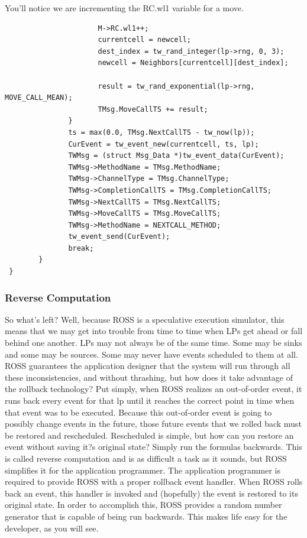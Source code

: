 \documentclass[12pt]{article}
\begin{document}
You'll notice we are incrementing the RC.wl1 variable for a move.

 
\begin{verbatim}
                      M->RC.wl1++;
                      currentcell = newcell;
                      dest_index = tw_rand_integer(lp->rng, 0, 3);
                      newcell = Neighbors[currentcell][dest_index];

                      result = tw_rand_exponential(lp->rng, MOVE_CALL_MEAN);
                      TMsg.MoveCallTS += result;
               }
               ts = max(0.0, TMsg.NextCallTS - tw_now(lp));
               CurEvent = tw_event_new(currentcell, ts, lp);
               TWMsg = (struct Msg_Data *)tw_event_data(CurEvent);
               TWMsg->MethodName = TMsg.MethodName;
               TWMsg->ChannelType = TMsg.ChannelType;
               TWMsg->CompletionCallTS = TMsg.CompletionCallTS;
               TWMsg->NextCallTS = TMsg.NextCallTS;
               TWMsg->MoveCallTS = TMsg.MoveCallTS;
               TWMsg->MethodName = NEXTCALL_METHOD;
               tw_event_send(CurEvent);
               break;
        }
 }
\end{verbatim}
 
\subsubsection{Reverse Computation}
So what's left?  Well, because ROSS is a speculative execution
simulator, this means that we may get into trouble from time to time
when LPs get ahead or fall behind one another.  LPs may not always be
of the same time.  Some may be sinks and some may be sources.  Some
may never have events scheduled to them at all.  ROSS guarantees the
application designer that the system will run through all these
inconsistencies, and without thrashing, but how does it take advantage
of the rollback technology?  Put simply, when ROSS realizes an
out-of-order event, it runs back every event for that lp until it
reaches the correct point in time when that event was to be executed.
Because this out-of-order event is going to possibly change events in
the future, those future events that we rolled back must be restored
and rescheduled.  Rescheduled is simple, but how can you restore an
event without saving it?s original state?  Simply run the formulas
backwards.  This is called reverse computation and is as difficult a
task as it sounds, but ROSS simplifies it for the application
programmer.  The application programmer is required to provide ROSS
with a proper rollback event handler.  When ROSS rolls back an event,
this handler is invoked and (hopefully) the event is restored to its
original state.  In order to accomplish this, ROSS provides a random
number generator that is capable of being run backwards.  This makes
life easy for the developer, as you will see.
 
\end{document}
